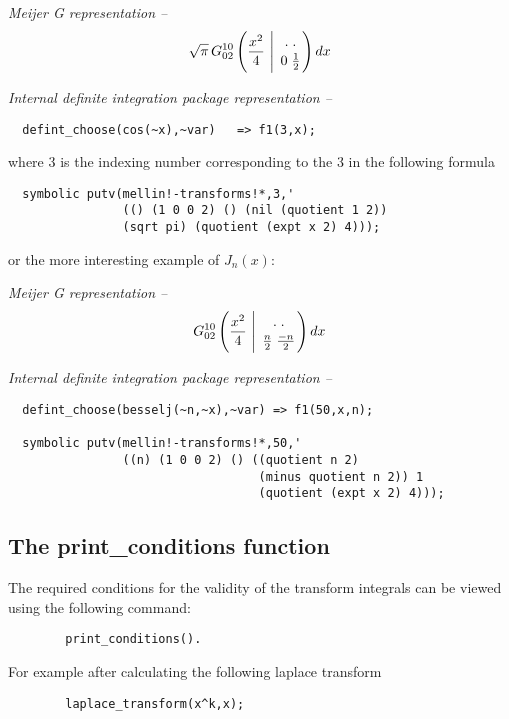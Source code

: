 \textit{Meijer G representation --}
\[
\sqrt{\pi} \,G^{1 0}_{0 2}\left(\frac{x^{2}}{4} \ \Bigg\vert
\ \MeijerGparams{ . \; . }{ 0 \; \frac{1}{2}} \right) dx
\]

\textit{Internal definite integration package representation --}
\begin{verbatim}
  defint_choose(cos(~x),~var)   => f1(3,x);
\end{verbatim}

where 3 is the indexing number corresponding to the 3
in the following formula

\begin{verbatim}
  symbolic putv(mellin!-transforms!*,3,'
                (() (1 0 0 2) () (nil (quotient 1 2))
                (sqrt pi) (quotient (expt x 2) 4)));
\end{verbatim} 

or the more interesting example of $J_{n}(x)$:

\textit{Meijer G representation --}
\[
G^{1 0}_{0 2} \left(\frac{x^{2}}{4} \ \Bigg\vert
\ \MeijerGparams{. \; .}{\frac{n}{2} \; {\frac{-n}{2}}} \right) dx
\]

\textit{Internal definite integration package representation --}

\begin{verbatim}
  defint_choose(besselj(~n,~x),~var) => f1(50,x,n);

  symbolic putv(mellin!-transforms!*,50,'
                ((n) (1 0 0 2) () ((quotient n 2)
                                   (minus quotient n 2)) 1
                                   (quotient (expt x 2) 4)));
\end{verbatim} 

\subsection{The print\_conditions function}
\hypertarget{operator:PRINT_CONDITIONS}{}

The required conditions for the validity of the transform integrals
can be viewed using the following command:

\begin{verbatim}
        print_conditions().
\end{verbatim}

For example after calculating the following laplace transform

\begin{verbatim}
        laplace_transform(x^k,x);
\end{verbatim}

